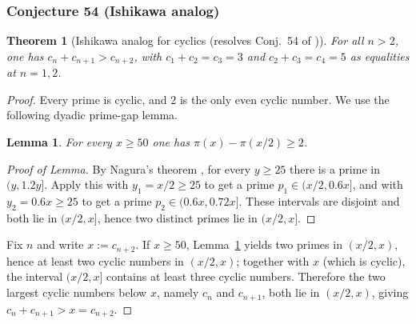 \documentclass[12pt]{article}
\newtheorem{theorem}{Theorem}
\newtheorem{lemma}{Lemma}[theorem]
\theoremstyle{remark}
\begin{document}


\subsubsection{Conjecture 54 (Ishikawa analog)}
\begin{theorem}[Ishikawa analog for cyclics (resolves Conj.~54 of \cite{Cohen2025})]\label{thm:ishikawa}
For all $n>2$, one has $c_n+c_{n+1}>c_{n+2}$, with $c_1+c_2=c_3=3$ and $c_2+c_3=c_4=5$ as equalities at $n=1,2$.
\end{theorem}

\begin{proof}
Every prime is cyclic, and $2$ is the only even cyclic number. We use the following dyadic prime-gap lemma.

\begin{lemma}\label{lem:dyadic}
For every $x\ge 50$ one has $\pi(x)-\pi(x/2)\ge2$.
\end{lemma}

\begin{proof}[Proof of Lemma]
By Nagura's theorem \cite{Nagura1952}, for every $y\ge25$ there is a prime in $(y,1.2y]$. Apply this with $y_1=x/2\ge25$ to get a prime $p_1\in(x/2,0.6x]$, and with $y_2=0.6x\ge25$ to get a prime $p_2\in(0.6x,0.72x]$. These intervals are disjoint and both lie in $(x/2,x]$, hence two distinct primes lie in $(x/2,x]$.
\end{proof}

Fix $n$ and write $x:=c_{n+2}$. If $x\ge50$, Lemma~\ref{lem:dyadic} yields two primes in $(x/2,x)$, hence at least two cyclic numbers in $(x/2,x)$; together with $x$ (which is cyclic), the interval $(x/2,x]$ contains at least three cyclic numbers. Therefore the two largest cyclic numbers below $x$, namely $c_n$ and $c_{n+1}$, both lie in $(x/2,x)$, giving $c_n+c_{n+1}>x=c_{n+2}$.


\end{proof}
\end{document}
